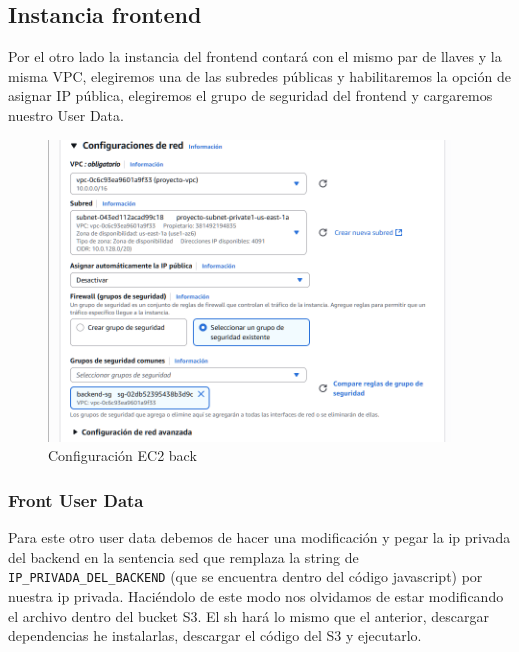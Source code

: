 \documentclass{article}
\begin{document}
	\subsection{Instancia frontend}

	Por el otro lado la instancia del frontend contará con el mismo par de llaves y la misma VPC, elegiremos una de las subredes públicas y habilitaremos la opción de asignar IP pública, elegiremos el grupo de seguridad del frontend y cargaremos nuestro User Data.

		
	\begin{figure}[H]
	\centering
	\includegraphics[width=0.95\textwidth]{configuracion_ec2_back.png}
	\caption{Configuración EC2 back}
	\end{figure}

	
	
	\newpage
	\subsubsection{Front User Data}

	Para este otro user data debemos de hacer una modificación y pegar la ip privada del backend en la sentencia sed que remplaza la string de \verb|IP_PRIVADA_DEL_BACKEND| (que se encuentra dentro del código javascript) por nuestra ip privada. Haciéndolo de este modo nos olvidamos de estar modificando el archivo dentro del bucket S3. El sh hará lo mismo que el anterior, descargar dependencias he instalarlas, descargar el código del S3 y ejecutarlo.
	
\end{document}
